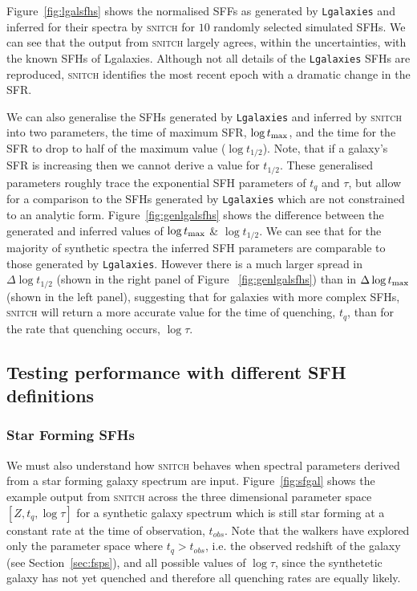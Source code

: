 \documentclass[useAMS,usenatbib]{mn2e}
\begin{document}
Figure~\ref{fig:lgalsfhs} shows the normalised SFFs as generated by \texttt{Lgalaxies} and inferred for their spectra by \textsc{snitch} for $10$ randomly selected simulated SFHs. We can see that the output from \textsc{snitch} largely agrees, within the uncertainties, with the known SFHs of Lgalaxies. Although not all details of the \texttt{Lgalaxies} SFHs are reproduced, \textsc{snitch} identifies the most recent epoch with a dramatic change in the SFR.

We can also generalise the SFHs generated by \texttt{Lgalaxies} and inferred by \textsc{snitch} into two parameters, the time of maximum SFR, $\log t_{\rm{max}}$, and the time for the SFR to drop to half of the maximum value ($\log t_{1/2}$). Note, that if a galaxy's SFR is increasing then we cannot derive a value for $t_{1/2}$. These generalised parameters roughly trace the exponential SFH parameters of $t_q$ and $\tau$, but allow for a comparison to the SFHs generated by \texttt{Lgalaxies} which are not constrained to an analytic form. Figure~\ref{fig:genlgalsfhs} shows the difference between the generated and inferred values of $\log t_{\rm{max}}$ \& $\log t_{1/2}$. We can see that for the majority of synthetic spectra the inferred SFH parameters are comparable to those generated by \texttt{Lgalaxies}. However there is a much larger spread in $\Delta \log t_{1/2}$ (shown in the right panel of Figure ~\ref{fig:genlgalsfhs}) than in $\Delta \log t_{\rm{max}}$ (shown in the left panel), suggesting that for galaxies with more complex SFHs, \textsc{snitch} will return a more accurate value for the time of quenching, $t_q$, than for the rate that quenching occurs, $\log \tau$.



\subsection{Testing performance with different SFH definitions}\label{sec:alldiffSFHs}

\subsubsection{Star Forming SFHs}\label{secsec:starforming}

We must also understand how \textsc{snitch} behaves when spectral parameters derived from a star forming galaxy spectrum are input. Figure~\ref{fig:sfgal} shows the example output from \textsc{snitch} across the three dimensional parameter space $[Z,t_q,\log \tau]$ for a synthetic galaxy spectrum which is still star forming at a constant rate at the time of observation, $t_{obs}$. Note that the walkers have explored only the parameter space where $t_q > t_{obs}$, i.e. the observed redshift of the galaxy (see Section~\ref{sec:fsps}), and all possible values of $\log \tau$, since the synthetetic galaxy has not yet quenched and therefore all quenching rates are equally likely.  
\end{document}
